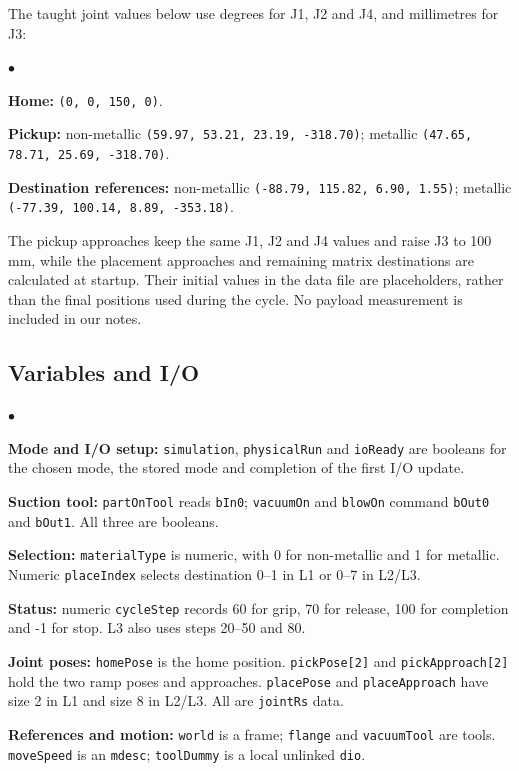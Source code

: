 \documentclass[11pt,a4paper]{article}
\newenvironment{compactitems}{\begin{list}{$\bullet$}{\setlength{\leftmargin}{1.2em}\setlength{\itemsep}{2pt}\setlength{\parsep}{0pt}\setlength{\topsep}{4pt}}\raggedright}{\end{list}}
\begin{document}
The taught joint values below use degrees for J1, J2 and J4, and millimetres for J3:
\begin{compactitems}
\item \textbf{Home:} \texttt{(0, 0, 150, 0)}.
\item \textbf{Pickup:} non-metallic \texttt{(59.97, 53.21, 23.19, -318.70)}; metallic \texttt{(47.65, 78.71, 25.69, -318.70)}.
\item \textbf{Destination references:} non-metallic \texttt{(-88.79, 115.82, 6.90, 1.55)}; metallic \texttt{(-77.39, 100.14, 8.89, -353.18)}.
\end{compactitems}
The pickup approaches keep the same J1, J2 and J4 values and raise J3 to 100\,mm, while the placement approaches and remaining matrix destinations are calculated at startup. Their initial values in the data file are placeholders, rather than the final positions used during the cycle. No payload measurement is included in our notes.

\subsection{Variables and I/O}
\begin{compactitems}
\item \textbf{Mode and I/O setup:} \texttt{simulation}, \texttt{physicalRun} and \texttt{ioReady} are booleans for the chosen mode, the stored mode and completion of the first I/O update.
\item \textbf{Suction tool:} \texttt{partOnTool} reads \texttt{bIn0}; \texttt{vacuumOn} and \texttt{blowOn} command \texttt{bOut0} and \texttt{bOut1}. All three are booleans.
\item \textbf{Selection:} \texttt{materialType} is numeric, with 0 for non-metallic and 1 for metallic. Numeric \texttt{placeIndex} selects destination 0--1 in L1 or 0--7 in L2/L3.
\item \textbf{Status:} numeric \texttt{cycleStep} records 60 for grip, 70 for release, 100 for completion and -1 for stop. L3 also uses steps 20--50 and 80.
\item \textbf{Joint poses:} \texttt{homePose} is the home position. \texttt{pickPose[2]} and \texttt{pickApproach[2]} hold the two ramp poses and approaches. \texttt{placePose} and \texttt{placeApproach} have size 2 in L1 and size 8 in L2/L3. All are \texttt{jointRs} data.
\item \textbf{References and motion:} \texttt{world} is a frame; \texttt{flange} and \texttt{vacuumTool} are tools. \texttt{moveSpeed} is an \texttt{mdesc}; \texttt{toolDummy} is a local unlinked \texttt{dio}.
\end{compactitems}
\end{document}
